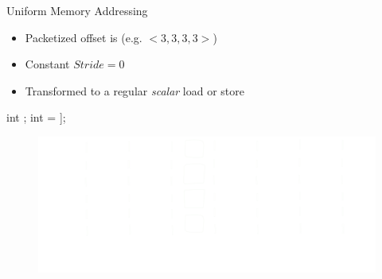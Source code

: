 \begin{frame}[fragile]{Uniform Memory Addressing}

\begin{itemize}
    \item Packetized offset is  (e.g. $<3, 3, 3, 3>$)
    \item Constant $Stride = 0$
    \item Transformed to a regular \emph{scalar} load or store
\end{itemize}

\begin{minipage}[t]{0.40\linewidth}
    \vspace{0.1ex}
    \begin{codebox}[commandchars=\\\[\]]

int \uniform[*src];
int \uniform[x] = \uniform[src]\idx[\uniform[3]];






    \end{codebox}
\end{minipage}
\hspace{2em}
\begin{minipage}[t]{0.49\linewidth}
    \vspace{0.6ex}
    \begin{figure}
        \includegraphics[width=1.0\textwidth]{images/uniform-access.pdf}
    \end{figure}
\end{minipage}

\end{frame}


